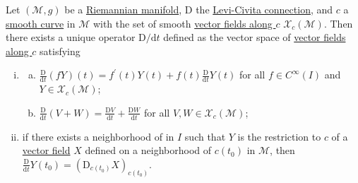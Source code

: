 \begin{proposition}\label{prop:covariant-derivative}
	Let \((\mathcal{M} , g)\) be a \hyperref[def:Riemannian-manifold]{Riemannian manifold}, \(\mathrm{D}\) the \hyperref[def:Levi-Civita-connection]{Levi-Civita connection}, and \(c\) a \hyperref[def:curve]{smooth curve} in \(\mathcal{M} \) with the set of smooth \hyperref[def:vector-field-along-curve]{vector fields along \(c\)} \(\mathcal{X} _c(\mathcal{M} )\). Then there exists a unique operator \(\mathrm{D} / \mathrm{d} t\) defined as the vector space of \hyperref[def:vector-field-along-curve]{vector fields along \(c\)} satisfying
	\begin{enumerate}[(i)]
		\item \label{prop:covariant-derivative-i}\begin{enumerate}[(a)]
			      \item \label{prop:covariant-derivative-i-a} \(\frac{\mathrm{D}}{\mathrm{d}t} (fY)(t) = f^\prime (t) Y(t) + f(t) \frac{\mathrm{D} }{\mathrm{d} t} Y(t)\) for all \(f\in C^{\infty} (I)\) and \(Y \in \mathcal{X} _c(\mathcal{M} )\);
			      \item \label{prop:covariant-derivative-i-b} \(\frac{\mathrm{D} }{\mathrm{d} t} (V+W) = \frac{\mathrm{D} V}{\mathrm{d} t} + \frac{\mathrm{D} W}{\mathrm{d} t}\) for all \(V, W\in \mathcal{X} _c(\mathcal{M} )\);
		      \end{enumerate}
		\item \label{prop:covariant-derivative-ii} if there exists a neighborhood of in \(I\) such that \(Y\) is the restriction to \(c\) of a \hyperref[def:vector-field]{vector field} \(X\) defined on a neighborhood of \(c(t_0)\) in \(\mathcal{M} \), then \(\frac{\mathrm{D} }{\mathrm{d} t} Y(t_0) = (\mathrm{D}_{c(t_0)} X) _{c(t_0)}\).
	\end{enumerate}
\end{proposition}
